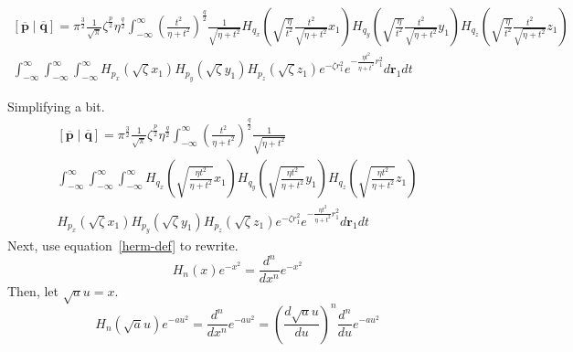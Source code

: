 \documentclass[twoside,10pt,draft]{article}
\begin{document}
\begin{multline}
  \left[\overline{\mathbf{p}}\middle|\overline{\mathbf{q}}\right] = \pi^{\frac{3}{2}} \frac{1}{\sqrt{\pi}} \zeta^{\frac{p}{2}} \eta^{\frac{q}{2}} \int_{-\infty}^\infty \left(\frac{t^2}{\eta + t^2}\right)^{\frac{q}{2}} \frac{1}{\sqrt{\eta + t^2}} H_{q_x}\left(\sqrt{\frac{\eta}{t^2}}\frac{t^2}{\sqrt{\eta + t^2}} x_1\right) H_{q_y}\left(\sqrt{\frac{\eta}{t^2}}\frac{t^2}{\sqrt{\eta + t^2}} y_1\right)H_{q_z}\left(\sqrt{\frac{\eta}{t^2}}\frac{t^2}{\sqrt{\eta + t^2}} z_1\right)\\
  \int_{-\infty}^\infty \int_{-\infty}^\infty \int_{-\infty}^\infty H_{p_x}\left(\sqrt{\zeta} x_1\right) H_{p_y}\left(\sqrt{\zeta} y_1\right) H_{p_z}\left(\sqrt{\zeta} z_1\right) e^{-\zeta r_1^2}e^{-\frac{\eta t^2}{\eta + t^2}r_1^2} d\mathbf{r}_1 dt  
\end{multline}

Simplifying a bit.
\begin{multline}
  \left[\overline{\mathbf{p}}\middle|\overline{\mathbf{q}}\right] = \pi^{\frac{3}{2}} \frac{1}{\sqrt{\pi}} \zeta^{\frac{p}{2}} \eta^{\frac{q}{2}} \int_{-\infty}^\infty \left(\frac{t^2}{\eta + t^2}\right)^{\frac{q}{2}}\frac{1}{\sqrt{\eta + t^2}}\\
  \int_{-\infty}^\infty \int_{-\infty}^\infty \int_{-\infty}^\infty H_{q_x}\left(\sqrt{\frac{\eta t^2}{\eta + t^2}}x_1\right)H_{q_y}\left(\sqrt{\frac{\eta t^2}{\eta + t^2}} y_1\right)H_{q_z}\left(\sqrt{\frac{\eta t^2}{\eta + t^2}}z_1\right)\\
   H_{p_x}\left(\sqrt{\zeta} x_1\right) H_{p_y}\left(\sqrt{\zeta} y_1\right) H_{p_z}\left(\sqrt{\zeta} z_1\right) e^{-\zeta r_1^2}e^{-\frac{\eta t^2}{\eta + t^2}r_1^2} d\mathbf{r}_1 dt  
\end{multline}
Next, use equation~\ref{herm-def} to rewrite.
\begin{equation}
  H_n(x) e^{-x^2}= \frac{d^n}{dx^n} e^{-x^2}
\end{equation}
Then, let $\sqrt{a}u = x$.
\begin{equation}
  H_n(\sqrt{a}u) e^{-au^2} = \frac{d^n}{dx^n} e^{-au^2} = \left(\frac{d\sqrt{a}u}{du}\right)^n\frac{d^n}{du} e^{-au^2}
\end{equation}

  





\end{document}
